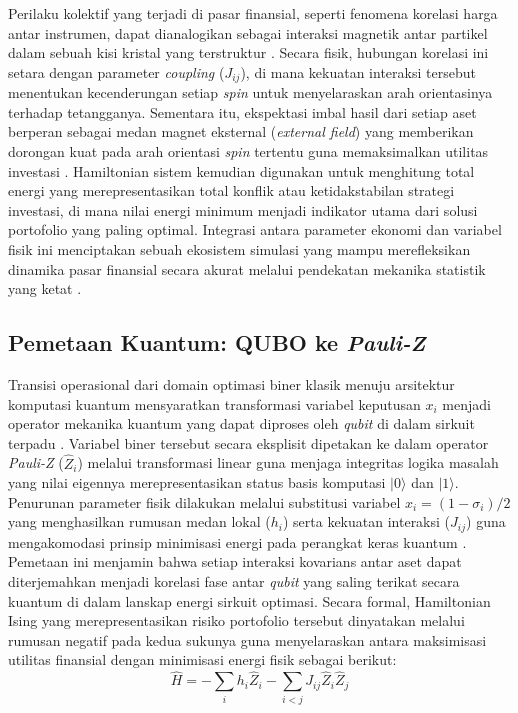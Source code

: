 Perilaku kolektif yang terjadi di pasar finansial, seperti fenomena korelasi harga antar instrumen, dapat dianalogikan sebagai interaksi magnetik antar partikel dalam sebuah kisi kristal yang terstruktur \cite{galam_ising_2010}. Secara fisik, hubungan korelasi ini setara dengan parameter \textit{coupling} ($J_{ij}$), di mana kekuatan interaksi tersebut menentukan kecenderungan setiap \textit{spin} untuk menyelaraskan arah orientasinya terhadap tetangganya. Sementara itu, ekspektasi imbal hasil dari setiap aset berperan sebagai medan magnet eksternal (\textit{external field}) yang memberikan dorongan kuat pada arah orientasi \textit{spin} tertentu guna memaksimalkan utilitas investasi \cite{lucas_ising_2014}. Hamiltonian sistem kemudian digunakan untuk menghitung total energi yang merepresentasikan total konflik atau ketidakstabilan strategi investasi, di mana nilai energi minimum menjadi indikator utama dari solusi portofolio yang paling optimal. Integrasi antara parameter ekonomi dan variabel fisik ini menciptakan sebuah ekosistem simulasi yang mampu merefleksikan dinamika pasar finansial secara akurat melalui pendekatan mekanika statistik yang ketat \cite{hidalgo_quantum_2006}.

\subsection{Pemetaan Kuantum: QUBO ke \textit{Pauli-Z}}
Transisi operasional dari domain optimasi biner klasik menuju arsitektur komputasi kuantum mensyaratkan transformasi variabel keputusan $x_i$ menjadi operator mekanika kuantum yang dapat diproses oleh \textit{qubit} di dalam sirkuit terpadu \cite{lucas_ising_2014}. Variabel biner tersebut secara eksplisit dipetakan ke dalam operator \textit{Pauli-Z} ($\hat{Z}_i$) melalui transformasi linear guna menjaga integritas logika masalah yang nilai eigennya merepresentasikan status basis komputasi $|0\rangle$ dan $|1\rangle$. Penurunan parameter fisik dilakukan melalui substitusi variabel $x_i = (1 - \sigma_i)/2$ yang menghasilkan rumusan medan lokal ($h_i$) serta kekuatan interaksi ($J_{ij}$) guna mengakomodasi prinsip minimisasi energi pada perangkat keras kuantum \cite{fedorov_vqe_2022}. Pemetaan ini menjamin bahwa setiap interaksi kovarians antar aset dapat diterjemahkan menjadi korelasi fase antar \textit{qubit} yang saling terikat secara kuantum di dalam lanskap energi sirkuit optimasi. Secara formal, Hamiltonian Ising yang merepresentasikan risiko portofolio tersebut dinyatakan melalui rumusan negatif pada kedua sukunya guna menyelaraskan antara maksimisasi utilitas finansial dengan minimisasi energi fisik sebagai berikut:
\begin{equation}
\hat{H} = - \sum_{i} h_i \hat{Z}_i - \sum_{i < j} J_{ij} \hat{Z}_i \hat{Z}_j
\end{equation}


